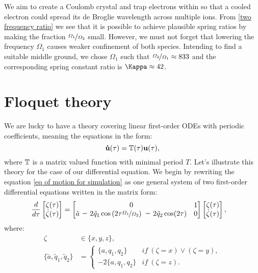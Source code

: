 We aim to create a Coulomb crystal and trap electrons within so that a cooled electron could spread its de Broglie wavelength across multiple ions. From \eqref{two frequency ratio} we see that it is possible to achieve plausible spring ratios by making the fraction $\nicefrac{\Omega_1}{\Omega_2}$ small. However, we must not forget that lowering the frequency $\Omega_1$ causes weaker confinement of both species. Intending to find a suitable middle ground, we chose $\Omega_1$ such that $\nicefrac{\Omega_2}{\Omega_1} \approx 833$ and the corresponding spring constant ratio is $\Kappa \approx 42$.

\section{Floquet theory}
\label{sec:floquet theory}
We are lucky to have a theory covering linear first-order ODEs with periodic coefficients, meaning the equations in the form:
\begin{equation}
	\label{Floquet structure}
	\vb{\dot{u}}(\tau) = \mathbb{T}(\tau) \vb{u}(\tau),
\end{equation}
where $\mathbb{T}$ is a matrix valued function with minimal period $T$. Let's illustrate this theory for the case of our differential equation. We begin by rewriting the equation \eqref{eq of motion for simulation} as one general system of two first-order differential equations written in the matrix form:
\begin{align}
\label{matrix mathieu}
	\frac{d}{d \tau}
	\begin{bmatrix}
		\zeta(\tau) \\
		\dot{\zeta}(\tau)
	\end{bmatrix}	
	&=
	\begin{bmatrix}
		0 & 1 \\
		\tilde{a} \minus 2 \tilde{q}_1 \cos\left(2 \tau \nicefrac{\Omega_1}{\Omega_2} \right) \minus 2 \tilde{q}_2 \cos(2\tau) & 0	
	\end{bmatrix}
	\begin{bmatrix}
		\zeta(\tau) \\
		\dot{\zeta}(\tau)
	\end{bmatrix},
\end{align}
where:
\begin{align}
	\label{xi variable}
	\zeta &\in \{x,y,z\}, \\
	\label{tilde params} 
	\{ \tilde{a}, \tilde{q}_1, \tilde{q}_2 \} &= \begin{cases}
		\{a, q_1, q_2\} &if \ (\zeta = x) \lor (\zeta = y), \\
		\minus 2 \{a, q_1, q_2\} &if \ (\zeta = z). 
	\end{cases}
\end{align}
